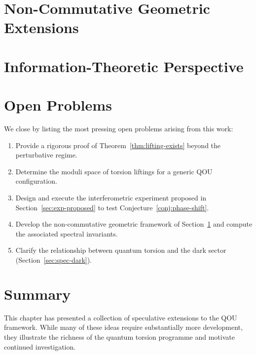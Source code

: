 
\section{Non-Commutative Geometric Extensions}
\label{sec:spec-ncg}


\section{Information-Theoretic Perspective}
\label{sec:spec-information}


\section{Open Problems}
\label{sec:spec-open}

We close by listing the most pressing open problems arising from this work:

\begin{enumerate}
  \item Provide a rigorous proof of Theorem~\ref{thm:lifting-exists} beyond
        the perturbative regime.
  \item Determine the moduli space of torsion liftings for a generic QOU
        configuration.
  \item Design and execute the interferometric experiment proposed in
        Section~\ref{sec:exp-proposed} to test
        Conjecture~\ref{conj:phase-shift}.
  \item Develop the non-commutative geometric framework of
        Section~\ref{sec:spec-ncg} and compute the associated spectral
        invariants.
  \item Clarify the relationship between quantum torsion and the dark sector
        (Section~\ref{sec:spec-dark}).
\end{enumerate}

\section{Summary}
\label{sec:spec-summary}

This chapter has presented a collection of speculative extensions to the QOU
framework.  While many of these ideas require substantially more development,
they illustrate the richness of the quantum torsion programme and motivate
continued investigation.
